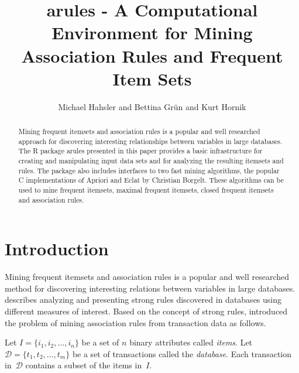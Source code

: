 \documentclass[10pt,a4paper]{article}
\newcommand{\strong}[1]{{\normalfont\fontseries{b}\selectfont #1}}
\newcommand{\pkg}[1]{\strong{#1}}
\newcommand{\proglang}[1]{\textsf{#1}}
\newcommand{\set}[1]{\mathcal{#1}}
\begin{document}
\title{\pkg{arules} -  A Computational Environment for Mining 
    Association Rules and Frequent Item Sets}
\author{Michael Hahsler and Bettina Gr{\"u}n and Kurt Hornik}
\maketitle
\sloppy
\begin{abstract}
  Mining frequent itemsets and association rules is a popular and well
  researched approach for discovering interesting relationships between
  variables in large databases.  The \proglang{R} package \pkg{arules}
  presented in this paper provides a basic infrastructure for creating
  and manipulating input data sets and for analyzing the resulting
  itemsets and rules.  The package also includes interfaces to two fast
  mining algorithms, the popular \proglang{C} implementations of Apriori
  and Eclat by Christian Borgelt.  These algorithms can be used to mine
  frequent itemsets, maximal frequent itemsets, closed frequent itemsets
  and association rules.
\end{abstract}


\section{Introduction}

Mining frequent itemsets and association rules is a popular and well
researched method for discovering interesting relations between
variables in large databases. \cite{arules:Piatetsky-Shapiro:1991}
describes analyzing and presenting strong rules discovered in databases
using different measures of interest.  Based on the concept of strong
rules, \cite{arules:Agrawal+Imielinski+Swami:1993} introduced the
problem of mining association rules from transaction data as follows.

Let $I=\{i_1, i_2,\ldots,i_n\}$ be a set of $n$ binary attributes called
\emph{items}.  Let $\set{D} = \{t_1, t_2, \ldots, t_m\}$ be a set of
transactions called the \emph{database}.  Each transaction
in~$\set{D}$ contains a subset of the items in~$I$.
\end{document}

